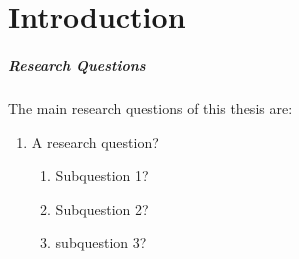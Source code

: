 \documentclass[../thesis.tex]{subfiles}
\begin{document}
    \chapter{Introduction}
    \lipsum[1]

    \paragraph{Research Questions}\label{par:research-questions}
    The main research questions of this thesis are:
    \begin{enumerate}
        \item A research question?\label{RQ1}
            \begin{enumerate}[label*=\arabic*.]
                \item Subquestion 1?\label{RQ1.1}
                \item Subquestion 2?\label{RQ1.2}
                \item subquestion 3?\label{RQ1.3}
            \end{enumerate}
    \end{enumerate}
    \ifSubfilesClassLoaded{%
        \printbibliography{}%
    }{}
\end{document}
